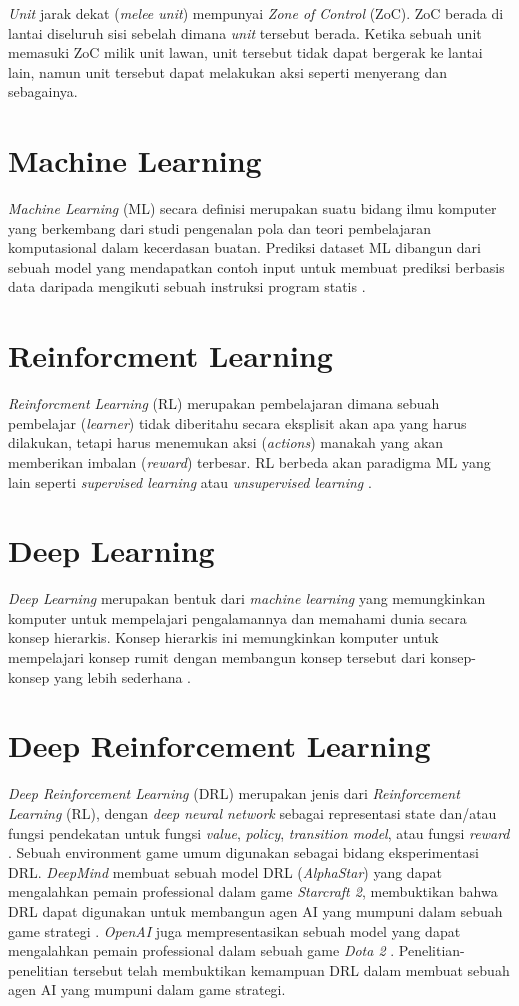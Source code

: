 \emph{Unit} jarak dekat (\emph{melee unit})  mempunyai \emph{Zone of Control} (ZoC). ZoC berada di lantai diseluruh sisi sebelah dimana 
\emph{unit} tersebut berada. Ketika sebuah unit memasuki ZoC milik unit lawan, unit tersebut tidak dapat bergerak ke lantai lain, namun
unit tersebut dapat melakukan aksi seperti menyerang dan sebagainya.

\section{Machine Learning}
\emph{Machine Learning} (ML) secara definisi merupakan suatu bidang ilmu komputer yang berkembang dari studi pengenalan pola dan teori pembelajaran komputasional dalam kecerdasan buatan. 
Prediksi dataset ML dibangun dari sebuah model yang mendapatkan contoh input untuk membuat prediksi berbasis data daripada mengikuti sebuah instruksi program statis \citep{machineL}.

\section{Reinforcment Learning}
\emph{Reinforcment Learning} (RL) merupakan pembelajaran dimana sebuah pembelajar (\emph{learner}) tidak diberitahu
secara eksplisit akan apa yang harus dilakukan, tetapi harus menemukan aksi (\emph{actions}) 
manakah yang akan memberikan imbalan (\emph{reward}) terbesar. 
RL berbeda akan paradigma ML yang lain seperti \emph{supervised learning} atau \emph{unsupervised learning} \citep{reinforcmentL}. 

\section{Deep Learning}
\emph{Deep Learning} merupakan bentuk dari \emph{machine learning} yang memungkinkan komputer untuk mempelajari pengalamannya dan memahami dunia secara konsep hierarkis. 
Konsep hierarkis ini memungkinkan komputer untuk mempelajari konsep rumit dengan membangun konsep tersebut dari konsep-konsep yang lebih sederhana \citep{deepL}.

\section{Deep Reinforcement Learning}
\emph{Deep Reinforcement Learning} (DRL) merupakan jenis dari \emph{Reinforcement Learning} (RL), dengan \emph{deep neural network} sebagai representasi state
dan/atau fungsi pendekatan untuk fungsi \emph{value}, \emph{policy}, \emph{transition model}, atau fungsi \emph{reward} \citep{deepRL}.
Sebuah environment game umum digunakan sebagai bidang eksperimentasi DRL.
\emph{DeepMind} membuat sebuah model DRL (\emph{AlphaStar}) yang dapat mengalahkan pemain professional dalam game \emph{Starcraft 2}, membuktikan bahwa DRL dapat digunakan untuk membangun agen AI yang mumpuni dalam sebuah game strategi \citep{alphaStar}.
\emph{OpenAI} juga mempresentasikan sebuah model yang dapat mengalahkan pemain professional dalam sebuah game \emph{Dota 2} \citep{openaiDota2}.
Penelitian-penelitian tersebut telah membuktikan kemampuan DRL dalam membuat sebuah agen AI yang mumpuni dalam game strategi.

